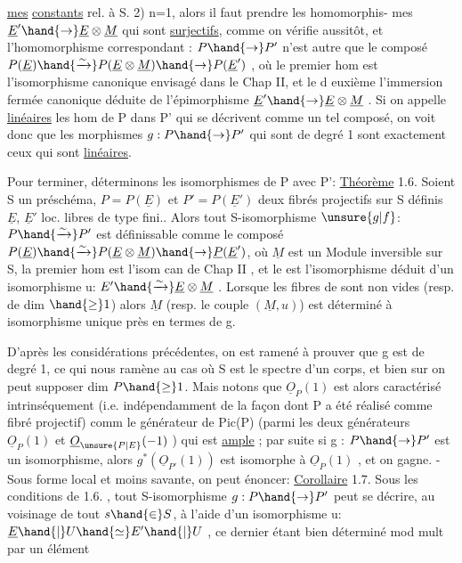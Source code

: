 
\uline{mes} \uline{constants} rel. à S. 2) n=1, alors il faut prendre les homomorphis-%
mes  $\underline{E}'\hand{\to} \underline{E}\otimes\underline{M}$ qui sont \uline{surjectifs}, comme on vérifie
aussitôt, et l'homomorphisme correspondant : $P\hand{\to} P'$ n'est autre que le
composé $P(\underline{E})\hand{\xrightarrow{\sim}}P(\underline{E}\otimes\underline{M})\hand{\to} P(\underline{E}')$ , où le premier hom est l'isomorphisme
canonique envisagé dans le Chap II, et le d euxième l'immersion fermée
canonique déduite de l'épimorphisme $\underline{E}'\hand{\to}\underline{E}\otimes\underline{M}$ . Si on appelle \uline{linéaires}
les hom de P dans P' qui se décrivent comme un tel composé, on voit donc
que les morphismes $g:P\hand{\to} P'$ qui sont de degré 1 sont exactement ceux qui
sont \uline{linéaires}.

Pour terminer, déterminons les isomorphismes de P avec P':
\uline{Théorème} 1.6. Soient S un préschéma, $P=P(\underline{E})$ et $P'=P(\underline{E}')$ deux fibrés
projectifs sur S définis  $\underline{E}$, $\underline{E}'$ loc. libres de type fini.. Alors tout S-isomorphisme $\unsure{g|f}$: $P\hand{\xrightarrow{\sim}}P'$ est définissable
comme le composé $P(\underline{E})\hand{\xrightarrow{\sim}}P(\underline{E}\otimes\underline{M})\hand{\to} \underline{P}(\underline{E}')$, où $\underline{M}$ est un Module inversible sur S, la premier hom est l'isom
can de Chap II , et le  est l'isomorphisme  déduit
d'un isomorphisme u: $E'\hand{\xrightarrow{\sim}}\underline{E}\otimes\underline{M}$ . Lorsque les fibres de  sont non
vides (resp. de dim $\hand{\geq} 1$) alors $\underline{M}$ (resp. le couple $(\underline{M},u)$) est déterminé
à isomorphisme unique près en termes de g.

D'après les considérations précédentes, on est ramené à prouver
que g est de degré 1, ce qui nous ramène au cas où S est le spectre d'un
corps, et bien sur on peut supposer dim $P\hand{\geq} 1$. Mais notons que $\underline{O}_P(1)$ est alors caractérisé intrinséquement (i.e.
indépendamment de la façon dont P a été réalisé comme fibré projectif)
comm le générateur de Pic(P) (parmi les deux générateurs $\underline{O}_P(1)$ et
$\underline{O}_{\unsure{P|E}}(-1)$ ) qui est \uline{ample} ; par suite si g : $P\hand{\to} P'$ est un isomorphisme,
alors $g^{*}(\underline{O}_{P'}(1))$ est isomorphe à $\underline{O}_P(1)$ , et on gagne. - Sous forme local
et moins savante, on peut énoncer:
\uline{Corollaire} 1.7. Sous les conditions de 1.6. , tout S-isomorphisme $g:P\hand{\to} P'$
peut se décrire, au voisinage de tout $s\hand{\in} S$, à l'aide d'un isomorphisme
u: $\underline{E}\hand{|}U \hand{\simeq} E'\hand{|}U$ , ce dernier étant bien déterminé mod mult par un élément
